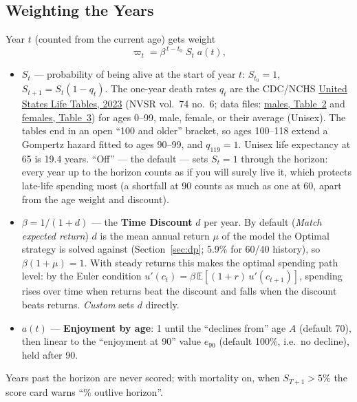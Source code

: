 \documentclass[11pt,letterpaper]{article}
\begin{document}
\subsection{Weighting the Years}
Year $t$ (counted from the current age) gets weight
\begin{equation}
\varpi_t = \beta^{\,t-t_0}\; S_t\; a(t),
\end{equation}
\begin{itemize}
\setlength\itemsep{1pt}
\item $S_t$ --- probability of being alive at the start of year $t$: $S_{t_0} = 1$, $S_{t+1} = S_t(1-q_t)$. The one-year death rates $q_t$ are the CDC/NCHS \href{https://www.cdc.gov/nchs/data/nvsr/nvsr74/nvsr74-06.pdf}{United States Life Tables, 2023} (NVSR vol.~74 no.~6; data files: \href{https://ftp.cdc.gov/pub/Health_Statistics/NCHS/Publications/NVSR/74-06/Table02.xlsx}{males, Table~2} and \href{https://ftp.cdc.gov/pub/Health_Statistics/NCHS/Publications/NVSR/74-06/Table03.xlsx}{females, Table~3}) for ages 0--99, male, female, or their average (Unisex). The tables end in an open ``100 and older'' bracket, so ages 100--118 extend a Gompertz hazard fitted to ages 90--99, and $q_{119} = 1$. Unisex life expectancy at 65 is 19.4 years. ``Off'' --- the default --- sets $S_t = 1$ through the horizon: every year up to the horizon counts as if you will surely live it, which protects late-life spending most (a shortfall at 90 counts as much as one at 60, apart from the age weight and discount).
\item $\beta = 1/(1+d)$ --- the \textbf{Time Discount} $d$ per year. By default (\emph{Match expected return}) $d$ is the mean annual return $\mu$ of the model the Optimal strategy is solved against (Section~\ref{sec:dp}; 5.9\% for 60/40 history), so $\beta(1+\mu)=1$. With steady returns this makes the optimal spending path level: by the Euler condition $u'(c_t) = \beta\,\mathbb{E}[(1+r)\,u'(c_{t+1})]$, spending rises over time when returns beat the discount and falls when the discount beats returns. \emph{Custom} sets $d$ directly.
\item $a(t)$ --- \textbf{Enjoyment by age}: 1 until the ``declines from'' age $A$ (default 70), then linear to the ``enjoyment at 90'' value $e_{90}$ (default 100\%, i.e.\ no decline), held after 90.
\end{itemize}
Years past the horizon are never scored; with mortality on, when $S_{T+1} > 5\%$ the score card warns ``\% outlive horizon''.
\end{document}
